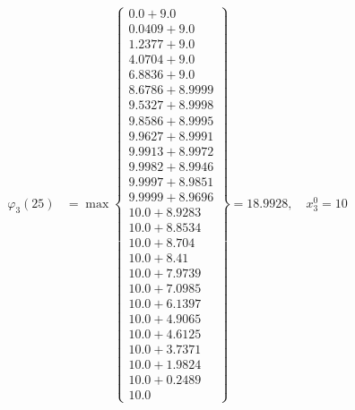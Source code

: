 \documentclass{article}
\begin{document}
\begin{align*}
  
  
  
\varphi_{3}(25) &= \max \left\{ \begin{array}{c}
0.0 + 9.0 \\
 0.0409 + 9.0 \\
 1.2377 + 9.0 \\
 4.0704 + 9.0 \\
 6.8836 + 9.0 \\
 8.6786 + 8.9999 \\
 9.5327 + 8.9998 \\
 9.8586 + 8.9995 \\
 9.9627 + 8.9991 \\
 9.9913 + 8.9972 \\
 9.9982 + 8.9946 \\
 9.9997 + 8.9851 \\
 9.9999 + 8.9696 \\
 10.0 + 8.9283 \\
 10.0 + 8.8534 \\
 10.0 + 8.704 \\
 10.0 + 8.41 \\
 10.0 + 7.9739 \\
 10.0 + 7.0985 \\
 10.0 + 6.1397 \\
 10.0 + 4.9065 \\
 10.0 + 4.6125 \\
 10.0 + 3.7371 \\
 10.0 + 1.9824 \\
 10.0 + 0.2489 \\
 10.0
\end{array} \right\}=18.9928,\quad x_{3}^0=10\\
  
  
  

\end{align*}
\end{document}
